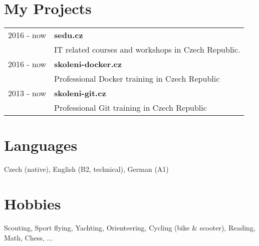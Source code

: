 \documentclass[12pt,a4paper]{article}
\begin{document}
\section*{My Projects}
\begin{tabular}{@{}p{2cm}l}
2016 - now & {\bf sedu.cz}\\
 & IT related courses and workshops in Czech Republic.\\
2016 - now & {\bf skoleni-docker.cz}\\
 & Professional Docker training in Czech Republic\\
2013 - now & {\bf skoleni-git.cz}\\
 & Professional Git training in Czech Republic\\
\end{tabular}


\section*{Languages}
Czech (native), English (B2, technical), German (A1)\\

\section*{Hobbies}
Scouting, Sport flying, Yachting, Orienteering, Cycling (bike \& scooter), Reading, Math, Chess, ...
\\
\end{document}
